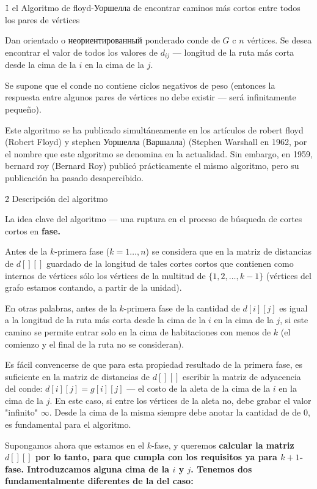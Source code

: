 \h1{ el Algoritmo de floyd-Уоршелла de encontrar caminos más cortos entre todos los pares de vértices }

Dan orientado o неориентированный ponderado conde de $G$ c $n$ vértices. Se desea encontrar el valor de todos los valores de $d_{ij}$ --- longitud de la ruta más corta desde la cima de la $i$ en la cima de la $j$.

Se supone que el conde no contiene ciclos negativos de peso (entonces la respuesta entre algunos pares de vértices no debe existir --- será infinitamente pequeño).

Este algoritmo se ha publicado simultáneamente en los artículos de robert floyd (Robert Floyd) y stephen Уоршелла (Варшалла) (Stephen Warshall en 1962, por el nombre que este algoritmo se denomina en la actualidad. Sin embargo, en 1959, bernard roy (Bernard Roy) publicó prácticamente el mismo algoritmo, pero su publicación ha pasado desapercibido.


\h2{ Descripción del algoritmo }

La idea clave del algoritmo --- una ruptura en el proceso de búsqueda de cortes cortos en \bf{fase}.

Antes de la $k$-primera fase ($k = 1 \ldots, n$) se considera que en la matriz de distancias de $d[][]$ guardado de la longitud de tales cortes cortos que contienen como internos de vértices sólo los vértices de la multitud de $\{ 1, 2, \ldots, k-1 \}$ (vértices del grafo estamos contando, a partir de la unidad).

En otras palabras, antes de la $k$-primera fase de la cantidad de $d[i][j]$ es igual a la longitud de la ruta más corta desde la cima de la $i$ en la cima de la $j$, si este camino se permite entrar solo en la cima de habitaciones con menos de $k$ (el comienzo y el final de la ruta no se consideran).

Es fácil convencerse de que para esta propiedad resultado de la primera fase, es suficiente en la matriz de distancias de $d[][]$ escribir la matriz de adyacencia del conde: $d[i][j] = g[i][j]$ --- el costo de la aleta de la cima de la $i$ en la cima de la $j$. En este caso, si entre los vértices de la aleta no, debe grabar el valor "infinito" $\infty$. Desde la cima de la misma siempre debe anotar la cantidad de de $0$, es fundamental para el algoritmo.

Supongamos ahora que estamos en el $k$-fase, y queremos \bf{calcular} la matriz $d[][]$ por lo tanto, para que cumpla con los requisitos ya para $k+1$-fase. Introduzcamos alguna cima de la $i$ y $j$. Tenemos dos fundamentalmente diferentes de la del caso:

